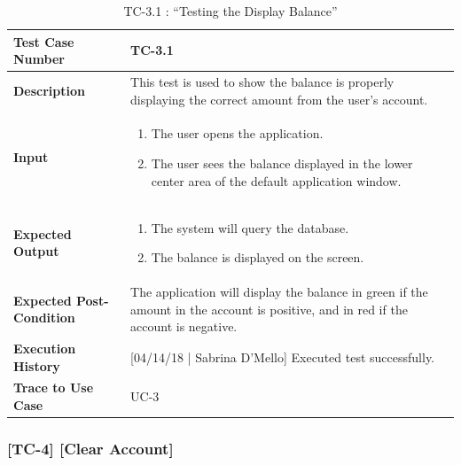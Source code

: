 \documentclass[12pt]{article}
\begin{document}
\begin{table}[H]
\caption{TC-3.1 : “Testing the Display Balance”}
\begin{center}
\begin{tabular}{|p{5.5	cm}|p{11cm}|}
\hline
\bf Test Case Number & TC-3.1\\
\hline
\bf Description & This test is used to show the balance is properly displaying the correct amount from the user's account.\\
\hline
\bf Input &
\begin{enumerate}
\item The user opens the application.
\item The user sees the balance displayed in the lower center area of the default application window.
\end{enumerate}
\\
\hline
\bf Expected Output &
\begin{enumerate}
\item The system will query the database.
\item The balance is displayed on the screen.
\end{enumerate}
\\
\hline
\bf Expected Post-Condition & The application will display the balance in green if the amount in the account is positive, and in red if the account is negative.\\
\hline
\bf Execution History & [04/14/18 | Sabrina D'Mello] Executed test successfully.\\
\hline
\bf Trace to Use Case & UC-3\\
\hline

\end{tabular}
\end{center}
\end{table}

\subsubsection{[TC-4] [Clear Account]} \label{tc:4}
\end{document}
